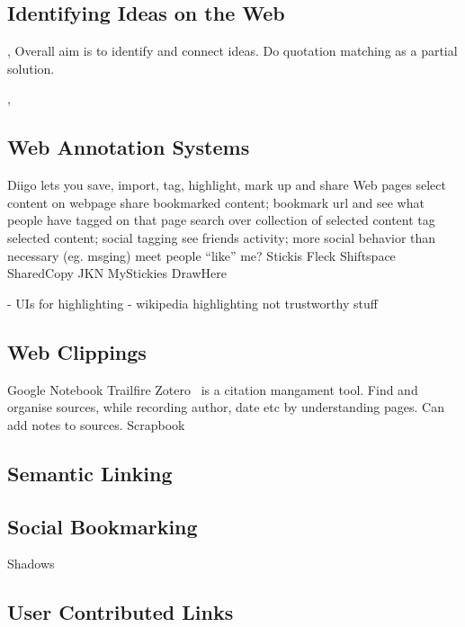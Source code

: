 \documentclass{chi2009}
\begin{document}
\subsection{Identifying Ideas on the Web}

\cite{quotations}, \cite{quotationdl} Overall aim is to identify and connect ideas. Do quotation matching as a partial solution.

\cite{scenthighlights}

\cite{ideanavigation}, \cite{citesense}


\subsection{Web Annotation Systems}

\cite{personalweb}

Diigo lets you save, import, tag, highlight, mark up and share Web pages
	select content on webpage
	share bookmarked content; bookmark url and see what people have tagged on that page
	search over collection of selected content
	tag selected content; social tagging
	see friends activity; more social behavior than necessary (eg. msging)
	meet people ``like'' me?
Stickis
Fleck
Shiftspace
SharedCopy
JKN
MyStickies
DrawHere

- UIs for highlighting
- wikipedia highlighting not trustworthy stuff

\subsection{Web Clippings}

Google Notebook
Trailfire
Zotero~\cite{zotero} is a citation mangament tool. Find and organise sources, while recording author, date etc by understanding pages. Can add notes to sources.
Scrapbook~\cite{scrapbook}

\subsection{Semantic Linking}

\subsection{Social Bookmarking}

Shadows

\subsection{User Contributed Links}
\end{document}
